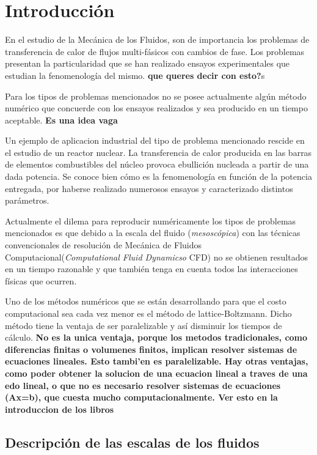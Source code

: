 \chapter{Introducción}
\graphicspath{{figs/cap1/}}
\label{cap1}



En el estudio de la Mecánica de los Fluidos, son de importancia los problemas de transferencia de calor de flujos multi-fásicos con cambios de fase. 
Los problemas presentan la particularidad que se han realizado ensayos experimentales que estudian la fenomenología del mismo. \textbf{que queres decir con esto?}s

Para los tipos de problemas mencionados no se posee actualmente algún método numérico que concuerde con los ensayos realizados y sea producido en un tiempo aceptable. \textbf{Es una idea vaga}

Un ejemplo de aplicacion industrial del tipo de problema mencionado rescide en el estudio de un reactor nuclear. La transferencia de calor producida en las barras de elementos combustibles del núcleo provoca ebullición nucleada a partir de una dada potencia. Se conoce bien cómo es la fenomenología en función de la potencia entregada, por haberse realizado numerosos ensayos y caracterizado distintos parámetros. 

Actualmente el dilema para reproducir numéricamente los tipos de problemas mencionados es que debido a la escala del fluido (\textit{mesoscópica}) con las técnicas convencionales de resolución de Mecánica de Fluidos Computacional(\textit{Computational Fluid Dynamicso} CFD) no se obtienen resultados en un tiempo razonable y que también tenga en cuenta todos las interacciones físicas que ocurren.

Uno de los métodos numéricos que se están desarrollando para que el costo computacional sea cada vez menor es el método de lattice-Boltzmann. Dicho método tiene la ventaja de ser paralelizable y así disminuir los tiempos de cálculo. \textbf{No es la unica ventaja, porque los metodos tradicionales, como diferencias finitas o volumenes finitos, implican resolver sistemas de ecuaciones lineales. Esto tambi’en es paralelizable. Hay otras ventajas, como poder obtener la solucion de una ecuacion lineal a traves de una edo lineal, o que no es necesario resolver sistemas de ecuaciones (Ax=b), que cuesta mucho computacionalmente. Ver esto en la introduccion de los libros}

\section{Descripción de las escalas de los fluidos}

